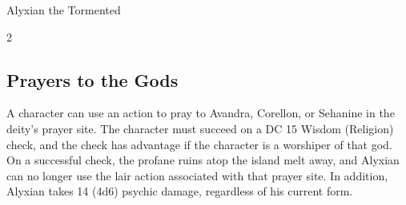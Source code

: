 \documentclass[10pt,a4paper,twoside,bg=print,twocolumn,openany,nodeprecatedcode]{dndbook}
\begin{document}
\begin{DndMonster}[float*=b,width=\textwidth + 8pt]{Alyxian the Tormented}
\begin{multicols}{2}
\begin{description}
\end{description}

\subsection{Prayers to the Gods}
A character can use an action to pray to Avandra, Corellon, or Sehanine in the deity's prayer site. The character must succeed on a DC 15 Wisdom (Religion) check, and the check has advantage if the character is a worshiper of that god. On a successful check, the profane ruins atop the island melt away, and Alyxian can no longer use the lair action associated with that prayer site. In addition, Alyxian takes 14 (4d6) psychic damage, regardless of his current form.

\end{multicols}
\end{DndMonster}
\end{document}
